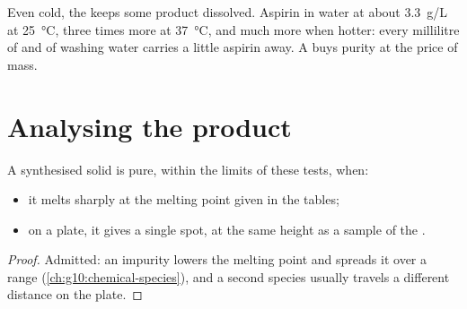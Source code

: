 \begin{remark}\label{rem:g10:synthesis-yield:losses}
Even cold, the  keeps some product dissolved. Aspirin 
in water at about \qty{3.3}{g/L} at \qty{25}{\celsius}, three times more
at \qty{37}{\celsius}, and much more when hotter: every millilitre of
 and of washing water carries a little aspirin away. A
 buys purity at the price of mass.
\end{remark}

\section{Analysing the product}

\begin{proposition}\label{prop:g10:synthesis-yield:checks}
A synthesised solid is pure, within the limits of these tests, when:
\begin{itemize}
  \item it melts sharply at the melting point given in the tables;
  \item on a  plate, it gives a single spot,
        at the same height as a sample of the .
\end{itemize}
\end{proposition}

\begin{proof}
Admitted: an impurity lowers the melting point and spreads it over a
range (\cref{ch:g10:chemical-species}), and a second species usually
travels a different distance on the plate.
\end{proof}

